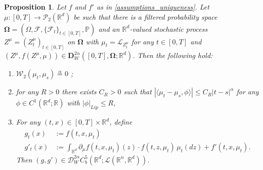 \documentclass[10pt, a4paper]{article} %
\newcommand{\R}{\mathbb{R}}
\theoremstyle{definition}
\theoremstyle{plain}
\newtheorem{prop}[defn]{Proposition}
\begin{document}
\begin{prop} \label{prop:stabilityundercomposition_uniqueness}
    Let $f$ and $f'$ as in \cref{assumptions_uniqueness}. 
    Let $\mu:[0,T] \to \mathcal{P}_2(\R^d)$ be such that there is a filtered probability space $\mathbf{\Omega} = (\Omega,\mathcal{F},\{\mathcal{F}_t\}_{t \in [0,T]},\mathbb{P})$ and an $\R^d$-valued stochastic process $Z^\mu=(Z^\mu_t)_{t \in [0,T]}$ on $\mathbf{\Omega}$ with $\mu_t = \mathcal{L}_{Z^\mu_t}$ for any $t \in [0,T]$ and $(Z^\mu,f(Z^\mu,\mu)) \in \mathbf{D}_W^{2\alpha}([0,T],\mathbf{\Omega};\R^d)$.
    Then the following hold: 
    \begin{enumerate} \renewcommand{\labelenumi}{(\roman{enumi})}
        \item $\mathcal{W}_2(\mu_t, \mu_s) \overset{\alpha}{=} 0$ ; 
        \item for any $R >0$ there exists $C_R >0$ such that $|\langle \mu_t - \mu_s, \phi \rangle| \le C_R |t-s|^\alpha$ for any $\phi \in C^1(\R^d; \R)$ with $|\phi|_{Lip} \le R$,  
        \item For any $(t,x) \in [0,T] \times \R^d$, define \begin{align*}
        g_t(x) &:= f(t, x,\mu_t) \\
        g'_t(x) &:= \int_{\R^d} \partial_\mu f (t, x,\mu_t) (z) \cdot f(t, z,\mu_t) \, \mu_t(dz) + f'(t, x,\mu_t) .
        \end{align*}
        Then $(g,g') \in \mathscr{D}_W^{2\alpha} C_b^5(\R^d;\mathscr{L}(\R^n,\R^d))$. 
    \end{enumerate}
\end{prop}
\end{document}
